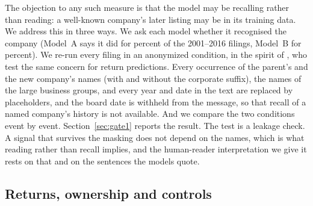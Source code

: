 The objection to any such measure is that the model may be recalling rather than reading: a well-known company's later listing may be in its training data. We address this in three ways. We ask each model whether it recognised the company (Model~A says it did for \ClaudeOutsideKnowledgeOld{} percent of the 2001--2016 filings, Model~B for \GPTOutsideKnowledgeOld{} percent). We re-run every filing in an anonymized condition, in the spirit of , who test the same concern for return predictions. Every occurrence of the parent's and the new company's names (with and without the corporate suffix), the names of the large business groups, and every year and date in the text are replaced by placeholders, and the board date is withheld from the message, so that recall of a named company's history is not available. And we compare the two conditions event by event. Section~\ref{sec:gate1} reports the result. The test is a leakage check. A signal that survives the masking does not depend on the names, which is what reading rather than recall implies, and the human-reader interpretation we give it rests on that and on the sentences the models quote.

\subsection{Returns, ownership and controls}\label{sec:returns}

